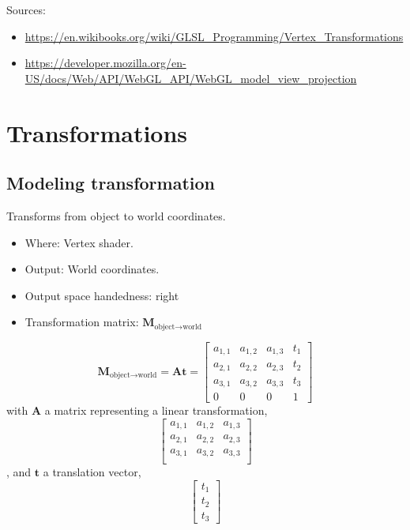 \documentclass{scrartcl}
\begin{document}
    Sources:
     \begin{itemize}
         \item \url{https://en.wikibooks.org/wiki/GLSL_Programming/Vertex_Transformations}
         \item      \url{https://developer.mozilla.org/en-US/docs/Web/API/WebGL_API/WebGL_model_view_projection}
     \end{itemize}

    \section{Transformations}

    \subsection{Modeling transformation}

        Transforms from object to world coordinates.
        \begin{itemize}
            \item Where: Vertex shader.
            \item Output: World coordinates.
            \item Output space handedness: right
            \item Transformation  matrix: \(\mathbf{M}_{\text{object}\to\text{world}}\)
        \end{itemize}


        \[
        \mathbf{M}_{\text{object}\to \text{world}} = \mathbf{A}\mathbf{t} =
        \begin{bmatrix}
            a_{1,1} & a_{1,2} & a_{1,3} & t_1 \\
            a_{2,1} & a_{2,2} & a_{2,3} & t_2 \\
            a_{3,1} & a_{3,2} & a_{3,3} & t_3 \\
            0 & 0 & 0 & 1
        \end{bmatrix}
        \]
        with $\mathbf{A}$ a matrix representing a linear transformation,
        \[
        \begin{bmatrix}
            a_{1,1} & a_{1,2} & a_{1,3} \\
            a_{2,1} & a_{2,2} & a_{2,3} \\
            a_{3,1} & a_{3,2} & a_{3,3} \\
        \end{bmatrix}
        \],
        and $\mathbf{t}$ a translation vector,
        \[
        \begin{bmatrix}
            t_1\\
            t_2\\
            t_3
        \end{bmatrix}
        \]
\end{document}
